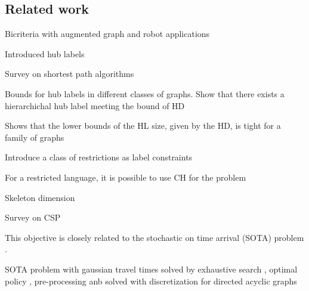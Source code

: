 \subsection{Related work}

Bicriteria with augmented graph and robot applications \cite{alex_bicriteria}

Introduced hub labels\cite{cohen_definition_hl}

Survey on shortest path algorithms \cite{goldberg_survey}

Bounds for hub labels in different classes of graphs. 
Show that there exists a hierarchichal hub label meeting the bound of HD \cite{babenko_hl_complexity}

Shows that the lower bounds of the HL size, given by the HD, is tight for a family of graphs \cite{white_complexity_hd}

Introduce a class of restrictions as label constraints \cite{language_csp}

For a restricted language, it is possible to use CH for the problem \cite{rice_csp}

Skeleton dimension \cite{skeleton}

Survey on CSP \cite{csp_survey}

This objective is closely related to the stochastic on time arrival (SOTA) problem \cite{fan2005arriving}.

SOTA problem with gaussian travel times solved by exhaustive search \cite{nikolova_gaussian}, optimal policy \cite{samaranayake2012speedup}, pre-processing \cite{sabran2014precomputation} anb solved with discretization for directed acyclic graphs \cite{nikolova_discretization}